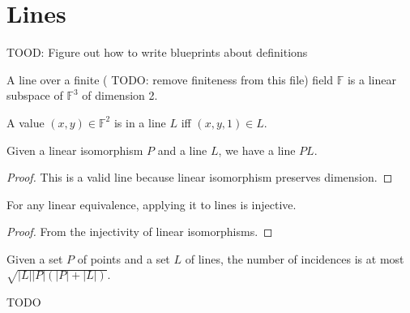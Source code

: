 \chapter{Lines}
\label{chap:line}

TOOD: Figure out how to write blueprints about definitions

\begin{definition}
    \label{Line}
    \leanok
    A line over a finite ({\color{red} TODO: remove finiteness from this file}) field $\mathbb{F}$ is a
    linear subspace of $\mathbb{F}^3$ of dimension 2.
\end{definition}

\begin{definition}
    \label{Line_mem}
    \leanok
    A value $(x, y) \in \mathbb{F}^2$ is in a line $L$ iff $(x, y, 1) \in L$.
\end{definition}

\begin{definition}
    \label{line_apply}
    \leanok
    Given a linear isomorphism $P$ and a line $L$, we have a line $PL$.
\end{definition}

\begin{proof}
    \leanok
    This is a valid line because linear isomorphism preserves dimension.
\end{proof}

\begin{lemma}
    \label{apply_injective}
    \leanok
    For any linear equivalence, applying it to lines is injective.
\end{lemma}

\begin{proof}
    \leanok
    From the injectivity of linear isomorphisms.
\end{proof}

\begin{theorem}
    \label{CS_UB}
    \leanok
    Given a set $P$ of points and a set $L$ of lines, the number of incidences is at most
    $\sqrt{|L| |P| (|P| + |L|)}$.
\end{theorem}

TODO
